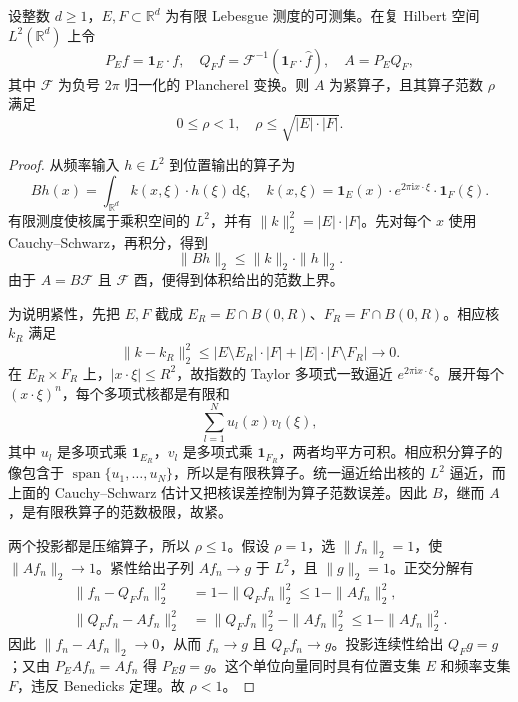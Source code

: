 \begin{proposition}[有限测度投影的严格范数界]
\label{b2:prop:20-projection-gap}
设整数 \(d\geq1\)，\(E,F\subset\mathbb R^d\) 为有限 Lebesgue 测度的可测集。在复 Hilbert 空间 \(L^2(\mathbb R^d)\) 上令
\[
 P_Ef=\mathbf1_E\cdot f,
 \quad Q_Ff=\mathcal F^{-1}(\mathbf1_F\cdot\widehat f),
 \quad A=P_EQ_F,
\]
其中 \(\mathcal F\) 为负号 \(2\pi\) 归一化的 Plancherel 变换。则 \(A\) 为紧算子，且其算子范数 \(\rho\) 满足
\[
 0\leq\rho<1,
 \quad \rho\leq\sqrt{|E|\cdot|F|}.
\]
\end{proposition}
\begin{proof}
从频率输入 \(h\in L^2\) 到位置输出的算子为
\[
 Bh(x)=\int_{\mathbb R^d}k(x,\xi)\cdot h(\xi)\,\mathrm d\xi,
 \quad k(x,\xi)=\mathbf1_E(x)\cdot e^{2\pi\mathrm i x\cdot\xi}\cdot\mathbf1_F(\xi).
\]
有限测度使核属于乘积空间的 \(L^2\)，并有
\(\|k\|_2^2=|E|\cdot|F|\)。先对每个 \(x\) 使用 Cauchy--Schwarz，再积分，得到
\[
 \|Bh\|_2\leq\|k\|_2\cdot\|h\|_2.
\]
由于 \(A=B\mathcal F\) 且 \(\mathcal F\) 酉，便得到体积给出的范数上界。

为说明紧性，先把 \(E,F\) 截成 \(E_R=E\cap B(0,R)\)、\(F_R=F\cap B(0,R)\)。相应核 \(k_R\) 满足
\[
 \|k-k_R\|_2^2
 \leq|E\setminus E_R|\cdot|F|
       +|E|\cdot|F\setminus F_R|\longrightarrow0.
\]
在 \(E_R\times F_R\) 上，\(|x\cdot\xi|\leq R^2\)，故指数的 Taylor 多项式一致逼近 \(e^{2\pi\mathrm i x\cdot\xi}\)。展开每个 \((x\cdot\xi)^n\)，每个多项式核都是有限和
\[
 \sum_{l=1}^N u_l(x)v_l(\xi),
\]
其中 \(u_l\) 是多项式乘 \(\mathbf1_{E_R}\)，\(v_l\) 是多项式乘 \(\mathbf1_{F_R}\)，两者均平方可积。相应积分算子的像包含于 \(\operatorname{span}\{u_1,\ldots,u_N\}\)，所以是有限秩算子。统一逼近给出核的 \(L^2\) 逼近，而上面的 Cauchy--Schwarz 估计又把核误差控制为算子范数误差。因此 \(B\)，继而 \(A\)，是有限秩算子的范数极限，故紧。

两个投影都是压缩算子，所以 \(\rho\leq1\)。假设 \(\rho=1\)，选 \(\|f_n\|_2=1\)，使 \(\|Af_n\|_2\to1\)。紧性给出子列 \(Af_n\to g\) 于 \(L^2\)，且 \(\|g\|_2=1\)。正交分解有
\[
 \begin{aligned}
 \|f_n-Q_Ff_n\|_2^2
 &=1-\|Q_Ff_n\|_2^2
 \leq1-\|Af_n\|_2^2,\\
 \|Q_Ff_n-Af_n\|_2^2
 &=\|Q_Ff_n\|_2^2-\|Af_n\|_2^2
 \leq1-\|Af_n\|_2^2.
 \end{aligned}
\]
因此 \(\|f_n-Af_n\|_2\to0\)，从而 \(f_n\to g\) 且 \(Q_Ff_n\to g\)。投影连续性给出 \(Q_Fg=g\)；又由 \(P_EAf_n=Af_n\) 得 \(P_Eg=g\)。这个单位向量同时具有位置支集 \(E\) 和频率支集 \(F\)，违反 Benedicks 定理。故 \(\rho<1\)。
\end{proof}


